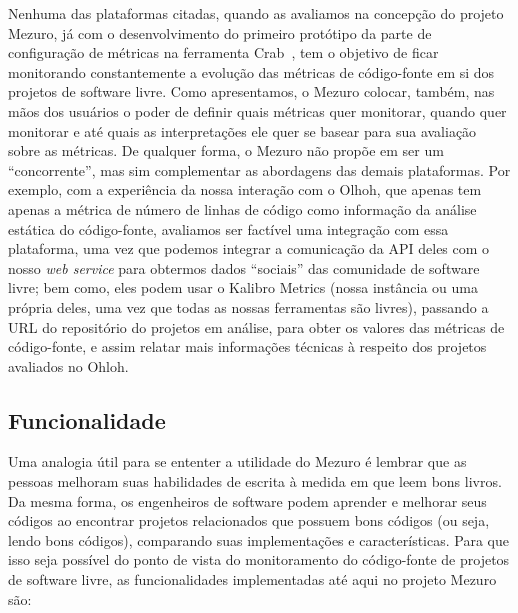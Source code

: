 Nenhuma das plataformas citadas, quando as avaliamos na concepção do projeto
Mezuro, já com o desenvolvimento do primeiro protótipo da parte de configuração
de métricas na ferramenta Crab~\citep{meirelles:sbes09}, tem o objetivo de
ficar monitorando constantemente a evolução das métricas de código-fonte em si
dos projetos de software livre.
%
Como apresentamos, o Mezuro colocar, também, nas mãos dos usuários
o poder de definir quais métricas quer monitorar, quando quer monitorar e até
quais as interpretações ele quer se basear para sua avaliação sobre as métricas.
%
De qualquer forma, o Mezuro não propõe em ser um ``concorrente'', mas sim
complementar as abordagens das demais plataformas.
%
Por exemplo, com a experiência da nossa interação com o Olhoh, que apenas tem
apenas a métrica de número de linhas de código como informação da análise
estática do código-fonte, avaliamos ser factível uma integração com essa plataforma, uma vez que podemos integrar
a comunicação da API deles com o nosso \textit{web service} para obtermos
dados ``sociais'' das comunidade de software livre; bem como, eles podem
usar o Kalibro Metrics (nossa instância ou uma própria deles, uma vez que todas
as nossas ferramentas são livres), passando a URL do repositório do projetos em
análise, para obter os valores das métricas de código-fonte, e assim relatar
mais informações técnicas à respeito dos projetos avaliados no Ohloh.


\subsection{Funcionalidade}

Uma analogia útil para se ententer a utilidade do Mezuro é lembrar que as
pessoas melhoram suas habilidades de escrita à medida em que leem bons livros.
%
Da mesma forma, os engenheiros de software podem aprender e melhorar seus códigos
ao encontrar projetos relacionados que possuem bons códigos (ou seja, lendo bons
códigos), comparando suas implementações e características.
%
Para que isso seja possível do ponto de vista do monitoramento do código-fonte
de projetos de software livre, as funcionalidades implementadas até aqui no
projeto Mezuro são:

